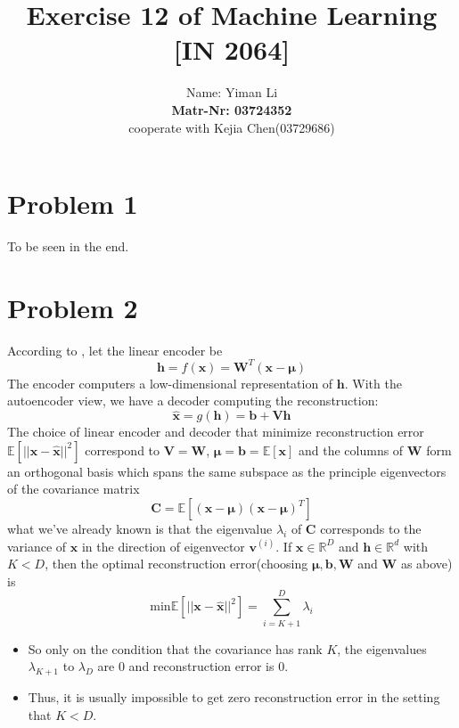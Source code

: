 \documentclass{article}
\title{Exercise 12 of Machine Learning [IN 2064]}
\author{
  Name: Yiman Li \\
  \textbf{Matr-Nr: 03724352} \\
  cooperate with Kejia Chen(03729686)\\
}
\begin{document}
\maketitle

\section*{Problem 1}
To be seen in the end.

\section*{Problem 2}
According to \cite{GoodBengCour16}, let the linear encoder be
\begin{equation}
 \bm{h} = f(\bm{x}) = \bm{W}^T(\bm{x}-\bm{\mu})
\end{equation}
The encoder computers a low-dimensional representation of $\bm{h}$. With the autoencoder view, we have a decoder computing the reconstruction:
\begin{equation}
	\hat{\bm{x}} = g(\bm{h}) = \bm{b} + \bm{Vh}
\end{equation}
The choice of linear encoder and decoder that minimize reconstruction error $\mathbb{E}[||\bm{x}-\hat{\bm{x}}||^2]$ correspond to $\bm{V} = \bm{W}$, $\bm{\mu} = \bm{b} = \mathbb{E}[\bm{x}]$ and the columns of $\bm{W}$ form an orthogonal basis which spans the same subspace as the principle eigenvectors of the covariance matrix
\begin{equation}
	\bm{C} = \mathbb{E}[(\bm{x}-\bm{\mu})(\bm{x}-\bm{\mu})^T]
\end{equation}
what we've already known is that the eigenvalue $\lambda_i$ of $\bm{C}$ corresponds to the variance of $\bm{x}$ in the direction of eigenvector $\bm{v}^{(i)}$. If $\bm{x} \in \mathbb{R}^D$ and $\bm{h} \in \mathbb{R}^d$ with $K<D$, then the optimal reconstruction error(choosing $\bm{\mu}, \bm{b}, \bm{W}$ and $\bm{W}$ as above) is 
\begin{equation}
	\mathrm{min} \mathbb{E}[||\bm{x}-\hat{\bm{x}}||^2] = \sum_{i=K+1}^{D} \lambda_i
\end{equation}
\begin{itemize}
	\item So only on the condition that the covariance has rank $K$, the eigenvalues $\lambda_{K+1}$ to $\lambda_D$ are 0 and reconstruction error is 0.
	\item Thus, it is usually impossible to get zero reconstruction error in the setting that $K<D$.
\end{itemize}
\end{document}
